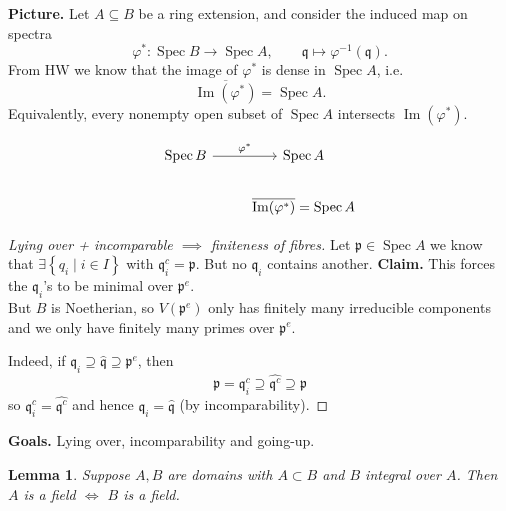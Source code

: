 \documentclass[11pt,a4paper]{article}
\theoremstyle{definition}
\theoremstyle{plain}
\newtheorem{lemma}[definition]{Lemma}
\theoremstyle{remark}
\renewcommand{\set}[1]{\left\{ #1 \right\}}
\newcommand{\Spec}{\operatorname{Spec}}
\begin{document}
\textbf{Picture.}
Let $A \subseteq B$ be a ring extension, and consider the induced map on spectra
\[
\varphi^* : \Spec B \longrightarrow \Spec A, 
\qquad \mathfrak q \longmapsto \varphi^{-1}(\mathfrak q).
\]
From HW we know that the image of $\varphi^*$ is dense in $\Spec A$, i.e.
\[
\overline{\operatorname{Im}(\varphi^*)} = \Spec A.
\]
Equivalently, every nonempty open subset of $\Spec A$ intersects
$\operatorname{Im}(\varphi^*)$.

\[
\begin{tikzcd}
\Spec B \arrow[r,"\varphi^*"] & \Spec A \\
& \overline{\operatorname{Im}(\varphi^*)} = \Spec A
\end{tikzcd}
\]

\begin{proof}[Lying over + incomparable $\implies$ finiteness of fibres]
    Let $\mathfrak{p} \in \Spec A$ we know that $\exists \set{q_i \mid i \in I}$ with $\mathfrak{q}_i^c = \mathfrak{p}$. But no 
    $\mathfrak{q}_i$ contains another. 
    \textbf{Claim.} This forces the $\mathfrak{q}_i$'s to be minimal over $\mathfrak{p}^e$. \\
    But $B$ is Noetherian, so $V(\mathfrak{p}^e)$ only has finitely many irreducible components and we only have finitely many 
    primes over $\mathfrak{p}^e$. 

    Indeed, if $\mathfrak{q}_i \supseteq \hat{\mathfrak{q}} \supseteq \mathfrak{p}^e$, then 
    $$\mathfrak{p} = \mathfrak{q}_i^c \supseteq \hat{\mathfrak{q}^c }\supseteq \mathfrak{p}$$
    so $\mathfrak{q}_i^c = \hat{\mathfrak{q}^c}$ and hence $\mathfrak{q}_i = \hat{\mathfrak{q}}$ (by incomparability).
\end{proof}

\textbf{Goals.} Lying over, incomparability and going-up. 

\begin{lemma}
    Suppose $A,B$ are domains with $A \subset B$ and $B$ integral over $A$. Then $A$ is a field $\iff$ $B$ is a field.
\end{lemma}
\end{document}
